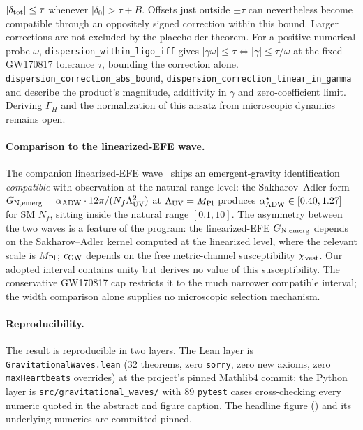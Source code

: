 \documentclass[aps,prl,reprint,nofootinbib,superscriptaddress]{revtex4-2}
\newcommand{\cGW}{c_{\rm GW}}
\newcommand{\chivest}{\chi_{\rm vest}}
\begin{document}
\begin{enumerate}
$|\delta_{\rm tot}|\leq\tau$ whenever $|\delta_0|>\tau+B$.
Offsets just outside $\pm\tau$ can nevertheless become compatible
through an oppositely signed correction within this bound.
Larger corrections are not excluded by the placeholder theorem.
For a positive numerical probe $\omega$,
\texttt{dispersion\_within\_ligo\_iff} gives
$|\gamma\omega|\leq\tau\iff|\gamma|\leq\tau/\omega$ at the fixed
GW170817 tolerance $\tau$, bounding the correction alone.
\texttt{dispersion\_correction\_abs\_bound},
\texttt{dispersion\_correction\_linear\_in\_gamma} and
 describe
the product's magnitude, additivity in $\gamma$ and zero-coefficient
limit.
Deriving $\Gamma_H$ and the normalization of this ansatz from
microscopic dynamics remains open.
\end{enumerate}

\paragraph{Comparison to the linearized-EFE wave.} The companion
linearized-EFE wave~\cite{Roehm2026LinearizedEFE} ships an
emergent-gravity identification \emph{compatible} with observation at
the natural-range level: the Sakharov--Adler form
$G_{\rm N,emerg} = \alpha_{\rm ADW} \cdot 12\pi/(N_f \Lambda_{\rm UV}^2)$
at $\Lambda_{\rm UV} = M_{\rm Pl}$ produces
$\alpha_{\rm ADW}^\star \in [0.40, 1.27]$ for SM $N_f$, sitting
inside the natural range $[0.1,10]$. The asymmetry between the two
waves is a feature of the program: the linearized-EFE
$G_{\rm N,emerg}$ depends on the Sakharov--Adler kernel computed at
the linearized level, where the relevant scale is $M_{\rm Pl}$;
$\cGW$ depends on the free metric-channel susceptibility
$\chivest$. Our adopted interval contains unity but derives no
value of this susceptibility. The conservative GW170817 cap
restricts it to the much narrower compatible interval; the
width comparison alone supplies no microscopic selection mechanism.

\paragraph{Reproducibility.} The result is reproducible in two
layers. The Lean layer is \texttt{GravitationalWaves.lean} (32
theorems, zero \texttt{sorry}, zero new axioms, zero
\texttt{maxHeartbeats} overrides) at the project's pinned
Mathlib4 commit; the Python layer is \texttt{src/gravitational\_waves/}
with 89 \texttt{pytest} cases cross-checking every numeric quoted
in the abstract and figure caption. The headline figure
()
and its underlying numerics are committed-pinned.
\end{document}
